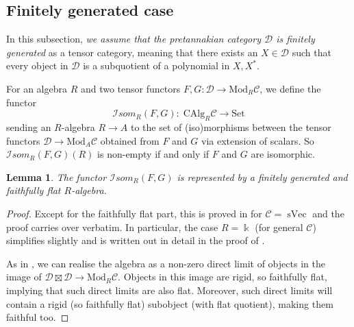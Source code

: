 \documentclass[11pt]{amsart}
\def\Ds{\mathscr{D}}
\def\cC{\mathscr{C}}
\def\bk{\Bbbk}
\def\sVec{\operatorname{sVec}}
\def\Set{\text{Set}}
\def\Mod{\mathrm{Mod}}
\newtheorem{lemma}[thm]{Lemma}
\theoremstyle{definition}
\theoremstyle{remark}
\numberwithin{equation}{section}
\newcommand{\Isom}{\mathcal{I}som}
\newcommand{\CAlg}{\mathrm{CAlg}}
\begin{document}
\subsection{Finitely generated case}\label{fingen}

In this subsection, {\em we assume that the pretannakian category $\Ds$ is finitely generated} as a tensor category, meaning that there exists an $X\in\Ds$ such that every object in $\Ds$ is a subquotient of a polynomial in $X,X^\ast$.

For an algebra $R$ and two tensor functors $F,G:\Ds\to \Mod_R\cC$, we define the functor
$$\Isom_R(F,G):\;\CAlg_R\cC\to \Set$$
sending an $R$-algebra $R\to A$ to the set of (iso)morphisms between the tensor functors $\Ds\to \Mod_{A}\cC$ obtained from $F$ and $G$ via extension of scalars. So $\Isom_R(F,G)(R)$ is non-empty if and only if $F$ and $G$ are isomorphic.
\begin{lemma}\label{fintypeDel}
  The functor  $\Isom_R(F,G)$ is represented by a finitely generated and faithfully flat $R$-algebra.
\end{lemma}

\begin{proof} Except for the faithfully flat part, this is proved in \cite[Proposition~4.1]{Del02} for $\cC=\sVec$ and the proof carries over verbatim. In particular, the case $R=\bk$ (for general $\cC$) simplifies slightly and is written out in detail in the proof of \cite[Proposition~7.3.2]{CEO}. 

As in \cite[\S 3]{Del02}, we can realise the algebra as a non-zero direct limit of objects in the image of $\Ds\boxtimes\Ds\to\Mod_{R}\cC$. Objects in this image are rigid, so faithfully flat, implying that such direct limits are also flat. Moreover, such direct limits will contain a rigid (so faithfully flat) subobject (with flat quotient), making them faithful too.
\end{proof}
\end{document}
